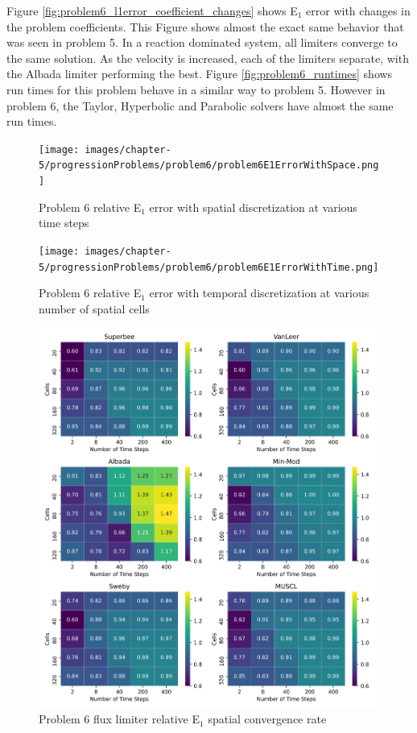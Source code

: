 Figure \ref{fig:problem6_l1error_coefficient_changes} shows E${}_{1}$ error with changes in the problem coefficients. This Figure shows almost the exact same behavior that was seen in problem 5. In a reaction dominated system, all limiters converge to the same solution. As the velocity is increased, each of the limiters separate, with the Albada limiter performing the best. Figure \ref{fig:problem6_runtimes} shows run times for this problem behave in a similar way to problem 5. However in problem 6, the Taylor, Hyperbolic and Parabolic solvers have almost the same run times.

\clearpage

\begin{figure}[p]
    \centering
    \texttt{[image: images/chapter-5/progressionProblems/problem6/problem6E1ErrorWithSpace.png]}
    \caption{Problem 6 relative E${}_{1}$ error with spatial discretization at various time steps}
    \label{fig:problem6_l1error_spatial_results}
\end{figure}

\clearpage

\begin{figure}[p]
    \centering
    \texttt{[image: images/chapter-5/progressionProblems/problem6/problem6E1ErrorWithTime.png]}
    \caption{Problem 6 relative E${}_{1}$ error with temporal discretization at various number of spatial cells}
    \label{fig:problem6_l1error_time_results}
\end{figure}

\clearpage

\begin{figure}[p]
    \centering
    \includegraphics[width=6in]{images/chapter-5/progressionProblems/problem6/problem6E1FluxLimiterConvergenceRate.png}
    \caption{Problem 6 flux limiter relative E${}_{1}$ spatial convergence rate}
    \label{fig:problem6_l1error_fluxlimiter_convergence_rate}
\end{figure}

